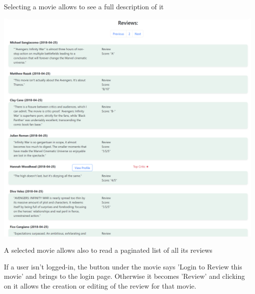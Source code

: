 Selecting a movie allows to see a full description of it
\begin{center}
\includegraphics[scale=0.45]{../../../images/user_manual/reviews_under_movie.png} 

\end{center}
\vspace{5pt}
A selected movie allows also to read a paginated list of all its reviews

If a user isn't logged-in, the button under the movie says 'Login to Review this movie' and brings to the login page. Otherwise it becomes 'Review' and clicking on it allows the creation or editing of the review for that movie.

